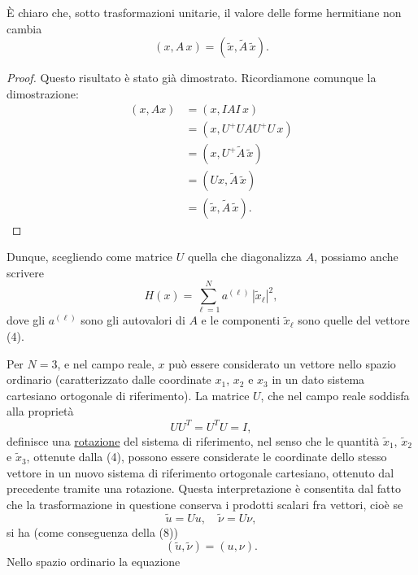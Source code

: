 \documentclass[11pt, a4paper]{book}
\numberwithin{equation}{section}
\begin{document}
È chiaro che, sotto trasformazioni unitarie, il valore delle forme
hermitiane non cambia
\begin{equation}
(x, A\,x) = (\widetilde{x}, \widetilde{A}\,\widetilde{x}).
\end{equation}


\begin{proof}
Questo risultato è stato già dimostrato. Ricordiamone comunque la
dimostrazione:
\begin{align*}
(x, Ax) &= (x, IAI\,x) \\
        &= (x, U^+UAU^+U\,x) \\
        &= (x, U^+\widetilde{A}\,\widetilde{x}) \\
        &= (Ux, \widetilde{A}\,\widetilde{x}) \\
        &= (\widetilde{x}, \widetilde{A}\,\widetilde{x}).
\end{align*}
\end{proof}

Dunque, scegliendo come matrice $U$ quella che diagonalizza $A$, possiamo
anche scrivere
\begin{equation}
H(x) = \sum_{\ell=1}^{N} a^{(\ell)}\,|\widetilde{x}_\ell|^2,
\end{equation}
dove gli $a^{(\ell)}$ sono gli autovalori di $A$ e le componenti
$\widetilde{x}_\ell$ sono quelle del vettore (4).

Per $N = 3$, e nel campo reale, $x$ può essere considerato un vettore nello
spazio ordinario (caratterizzato dalle coordinate $x_1$, $x_2$ e $x_3$ in
un dato sistema cartesiano ortogonale di riferimento). La matrice $U$, che
nel campo reale soddisfa alla proprietà
\begin{equation}
UU^T = U^TU = I,
\end{equation}
definisce una \uline{rotazione} del sistema di riferimento, nel senso
che le quantità $\widetilde{x}_1$, $\widetilde{x}_2$ e $\widetilde{x}_3$,
ottenute dalla (4), possono essere considerate le coordinate dello stesso
vettore in un nuovo sistema di riferimento ortogonale cartesiano, ottenuto
dal precedente tramite una rotazione. Questa interpretazione è consentita
dal fatto che la trasformazione in questione conserva i prodotti scalari fra
vettori, cioè se
\[
\widetilde{u} = Uu, \quad \widetilde{\nu} = U\nu,
\]
si ha (come conseguenza della (8))
\[
(\widetilde{u}, \widetilde{\nu}) = (u, \nu).
\]
Nello spazio ordinario la equazione

\end{document}
